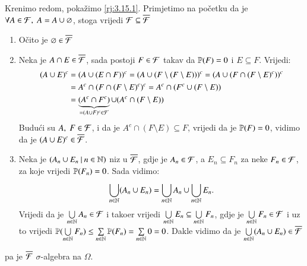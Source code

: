 \begin{rj}[\ref{zad:3.10}]
    Krenimo redom, poka\v zimo \ref{rj:3.15.1}.
    Primjetimo na po\v cetku da je $\forall A \in \mathcal{F}, \; A = A \cup \varnothing$, stoga vrijedi $\mathcal{F} \subseteq \overline{\mathcal{F}}$
    \begin{enumerate}[label=(\roman*)]
        \item O\v cito je $\varnothing \in \overline{\mathcal{F}}$
        \item Neka je $A \cap E \in \overline{\mathcal{F}}$, sada postoji $F \in \mathcal{F}$ takav da $\mathbb{P}({F}) = 0$ i $E \subseteq F$.
        Vrijedi:
        \begin{equation*}
            \begin{aligned}
                (A \cup E)^c &= (A \cup (E \cap F))^c = (A \cup (F \setminus (F \setminus E)))^c = (A \cup (F \cap (F \setminus E)^c))^c\\
                &= A^c \cap (F \cap (F \setminus E)^c)^c = A^c \cap (F^c \cup (F \setminus E))\\
                &= \underbrace{(A^c \cap F^c)}_{ = (A \cup F)^c \in \mathcal{F}} \cup (A^c \cap (F \setminus E))
            \end{aligned}
        \end{equation*}
        Budu\' ci su $A, \; F \in \mathcal{F}$, i da je $A^c \cap (F \setminus E) \subseteq F$, vrijedi da je $\mathbb{P}({F}) = 0$, vidimo da je $(A \cup E)^c \in \overline{\mathcal{F}}$.
        \item Neka je $({A_n \cup E_n} \: | \: {n \in \mathbb{N}})$ niz u $\overline{\mathcal{F}}$, gdje je $A_n \in \mathcal{F}$, a $E_n \subseteq F_n$ za neke $F_n \in \mathcal{F}$, za koje vrijedi $\mathbb{P}({F_n}) = 0$.
        Sada vidimo:
        \begin{equation*}
            \bigcup\limits_{n \in \mathbb{N}}^{} (A_n \cup E_n) = \bigcup\limits_{n \in \mathbb{N}}^{} A_n \cup \bigcup\limits_{n \in \mathbb{N}}^{} E_n.
        \end{equation*}
        Vrijedi da je $\bigcup\limits_{n \in \mathbb{N}}^{} A_n \in \mathcal{F}$ i tako\dj er vrijedi $\bigcup\limits_{n \in \mathbb{N}}^{} E_n \subseteq \bigcup\limits_{n \in \mathbb{N}}^{} F_n$, gdje je $\bigcup\limits_{n \in \mathbb{N}}^{} F_n \in \mathcal{F}$ i uz to vrijedi $\mathbb{P}({\bigcup\limits_{n \in \mathbb{N}}^{} F_n}) \leq \sum\limits_{n \in \mathbb{N}}^{} \mathbb{P}({F_n}) = \sum\limits_{n \in \mathbb{N}}^{} 0 = 0$.
        Dakle vidimo da je $\bigcup\limits_{n \in \mathbb{N}}^{} (A_n \cup E_n) \in \overline{\mathcal{F}}$
    \end{enumerate}
    pa je $\overline{\mathcal{F}}$ $\sigma$-algebra na $\Omega$.


\end{rj}
